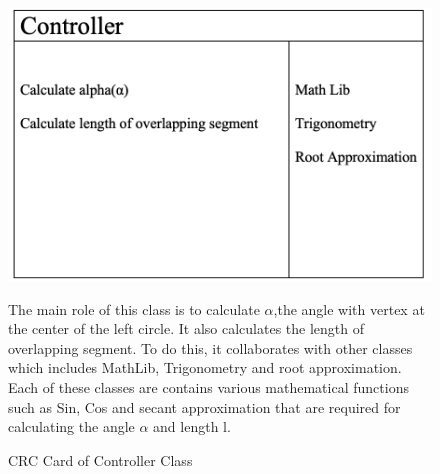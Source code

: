   \begin{figure}[h]
    \centering
    \includegraphics[width=.5\linewidth]{resources/Controller.png}
    \caption{CRC Card of Controller Class}\label{fig:control}
    \parbox{1.0\linewidth}{
      The main role of this class is to calculate $\alpha$,the angle with vertex at the center of the left circle. It also calculates the length of overlapping segment. To do this, it collaborates with other classes which includes MathLib, Trigonometry and root approximation. Each of these classes are contains various mathematical functions such as Sin, Cos and secant approximation that are required for calculating the angle $\alpha$ and length l.
      }
  \end{figure}
